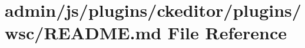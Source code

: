 \hypertarget{admin_2js_2plugins_2ckeditor_2plugins_2wsc_2_r_e_a_d_m_e_8md}{\section{admin/js/plugins/ckeditor/plugins/wsc/\-R\-E\-A\-D\-M\-E.md File Reference}
\label{admin_2js_2plugins_2ckeditor_2plugins_2wsc_2_r_e_a_d_m_e_8md}
}
